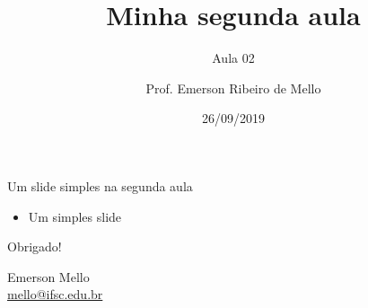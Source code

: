\documentclass{beamer}
\title{Minha segunda aula}
\subtitle{Aula 02}
\author{Prof. Emerson Ribeiro de Mello}
\institute{%
\href{mello@ifsc.edu.br}{mello@ifsc.edu.br}%
}%
\date{26/09/2019}
\begin{document}
\begin{frame}[plain]
	\titlepage
\end{frame}




\begin{frame}[wide]{Um slide simples na segunda aula}
\begin{itemize}
    \item Um simples slide
\end{itemize}
\end{frame}


\begin{frame}{}
\vspace{2cm}
    \begin{center}
        \huge Obrigado!
    \end{center}
    \vspace{2cm}
    \begin{flushright}
    Emerson Mello \\ \url{mello@ifsc.edu.br}
    \end{flushright}
\end{frame}
\end{document}
